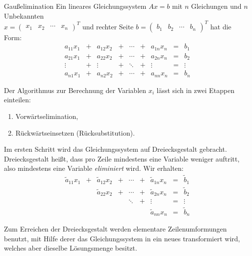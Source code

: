 \begin{algo}{Gaußelimination}
    Ein lineares Gleichungssystem $Ax = b$ mit $n$ Gleichungen und $n$ Unbekannten \\
    $x = \begin{pmatrix} x_1 & x_2 & \cdots & x_n \end{pmatrix}^T$ und rechter Seite $b = \begin{pmatrix} b_1 & b_2 & \cdots & b_n \end{pmatrix}^T$ hat die Form:
    \[
        \begin{matrix}
            a_{11} x_1 & + & a_{12} x_2 & + & \cdots & + & a_{1n} x_n & = & b_1    \\
            a_{21} x_1 & + & a_{22} x_2 & + & \cdots & + & a_{2n} x_n & = & b_2    \\
            \vdots     & + & \vdots     & + & \ddots & + & \vdots     & = & \vdots \\
            a_{n1} x_1 & + & a_{n2} x_2 & + & \cdots & + & a_{nn} x_n & = & b_n
        \end{matrix}
    \]

    Der Algorithmus zur Berechnung der Variablen $x_i$ lässt sich in zwei Etappen einteilen:
    \begin{enumerate}
        \item Vorwärtselimination,
        \item Rückwärtseinsetzen (Rücksubstitution).
    \end{enumerate}

    Im ersten Schritt wird das Gleichungssystem auf Dreiecksgestalt gebracht.
    Dreiecksgestalt heißt, dass pro Zeile mindestens eine Variable weniger auftritt, also mindestens eine Variable \emph{eliminiert} wird.
    Wir erhalten:
    \[
        \begin{matrix}
            \tilde{a}_{11} x_1 & + & \tilde{a}_{12} x_2 & + & \cdots & + & \tilde{a}_{1n} x_n & = & \tilde{b}_1 \\
                               &   & \tilde{a}_{22} x_2 & + & \cdots & + & \tilde{a}_{2n} x_n & = & \tilde{b}_2 \\
                               &   &                    &   & \ddots & + & \vdots             & = & \vdots      \\
                               &   &                    &   &        &   & \tilde{a}_{nn} x_n & = & \tilde{b}_n
        \end{matrix}
    \]

    Zum Erreichen der Dreiecksgestalt werden elementare Zeilenumformungen benutzt, mit Hilfe derer das Gleichungssystem in ein neues transformiert wird, welches aber dieselbe Lösungsmenge besitzt.


\end{algo}
